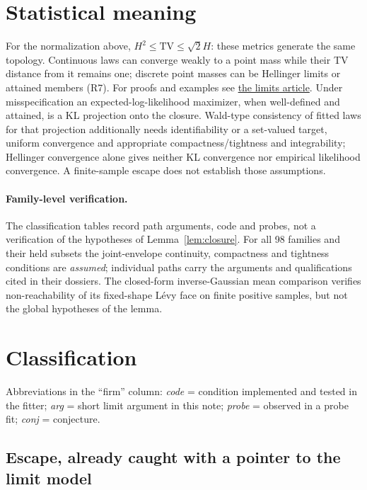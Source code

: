 \documentclass[11pt]{article}
\theoremstyle{plain}
\theoremstyle{definition}
\theoremstyle{remark}
\begin{document}
\section{Statistical meaning}\label{sec:statistical-meaning}
For the normalization above, $H^2\leq\mathrm{TV}\leq\sqrt2H$: these metrics generate the same topology. Continuous laws can converge weakly to a point mass while their TV distance from it remains one; discrete point masses can be Hellinger limits or attained members (R7). For proofs and examples see \href{../../univariateML-cpp/notes/limits.md}{the limits article}. Under misspecification an expected-log-likelihood maximizer, when well-defined and attained, is a KL projection onto the closure. Wald-type consistency of fitted laws for that projection additionally needs identifiability or a set-valued target, uniform convergence and appropriate compactness/tightness and integrability; Hellinger convergence alone gives neither KL convergence nor empirical likelihood convergence. A finite-sample escape does not establish those assumptions.

\paragraph{Family-level verification.} The classification tables record path arguments, code and probes, not a verification of the hypotheses of Lemma~\ref{lem:closure}. For all 98 families and their held subsets the joint-envelope continuity, compactness and tightness conditions are \emph{assumed}; individual paths carry the arguments and qualifications cited in their dossiers. The closed-form inverse-Gaussian mean comparison verifies non-reachability of its fixed-shape L\'evy face on finite positive samples, but not the global hypotheses of the lemma.

\section{Classification}

Abbreviations in the ``firm'' column: \emph{code} = condition implemented
and tested in the fitter; \emph{arg} = short limit argument in this note;
\emph{probe} = observed in a probe fit; \emph{conj} = conjecture.

\subsection{Escape, already caught with a pointer to the limit model}
\end{document}
